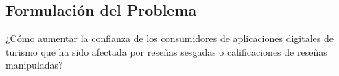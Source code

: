 \subsection{Formulación del Problema}
¿Cómo aumentar la confianza de los consumidores de aplicaciones digitales de turismo que ha sido afectada por reseñas sesgadas o calificaciones de reseñas manipuladas? 